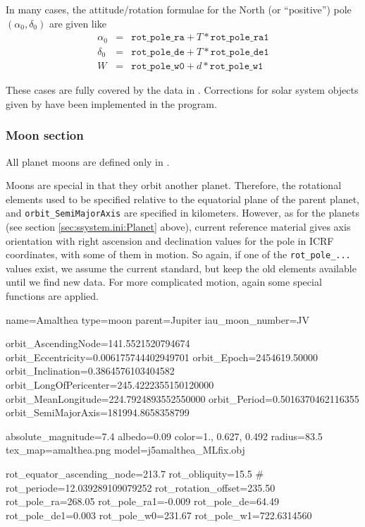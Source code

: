 \noindent In many cases, the attitude/rotation formulae for the North (or
``positive'') pole $(\alpha_0, \delta_0)$ are given like
\begin{eqnarray}
  \label{eq:PlanetOrientation}
  \alpha_0 &=& \mathtt{rot\_pole\_ra} + T * \mathtt{rot\_pole\_ra1}\\
  \delta_0 &=& \mathtt{rot\_pole\_de} + T * \mathtt{rot\_pole\_de1}\\
  W        &=& \mathtt{rot\_pole\_w0} + d * \mathtt{rot\_pole\_w1}
\end{eqnarray}

\noindent These cases are fully covered by the data in
. Corrections for solar system objects given
by \citet{ESAA:2013, WGCCRE2009, WGCCRE2009:corr, WGCCRE2015,
  WGCCRE2015:corr} have been implemented in the program.


\subsubsection{Moon section}
\label{sec:ssystem.ini:Moon}

All planet moons are defined only in .

Moons are special in that they orbit another planet. Therefore, the
rotational elements used to be specified relative to the equatorial
plane of the parent planet, and \texttt{orbit\_SemiMajorAxis} are
specified in kilometers.  However,  as for the
planets (see section \ref{sec:ssystem.ini:Planet} above), current
 reference material gives axis orientation with right
ascension and declination values for the pole in ICRF coordinates,
with some of them in motion. So again, if one of the
\texttt{rot\_pole\_...} values exist, we assume the current
standard, but keep the old elements available until we find new data.
For more complicated motion, again some special functions
are applied.


\begin{configfile}
[amalthea]
name=Amalthea
type=moon
parent=Jupiter
iau_moon_number=JV

orbit_AscendingNode=141.5521520794674
orbit_Eccentricity=0.006175744402949701
orbit_Epoch=2454619.50000
orbit_Inclination=0.3864576103404582
orbit_LongOfPericenter=245.4222355150120000
orbit_MeanLongitude=224.7924893552550000
orbit_Period=0.5016370462116355
orbit_SemiMajorAxis=181994.8658358799

absolute_magnitude=7.4
albedo=0.09
color=1., 0.627, 0.492
radius=83.5
tex_map=amalthea.png
model=j5amalthea_MLfix.obj


rot_equator_ascending_node=213.7
rot_obliquity=15.5
# rot_periode=12.039289109079252
rot_rotation_offset=235.50
rot_pole_ra=268.05
rot_pole_ra1=-0.009
rot_pole_de=64.49
rot_pole_de1=0.003
rot_pole_w0=231.67
rot_pole_w1=722.6314560
\end{configfile}


